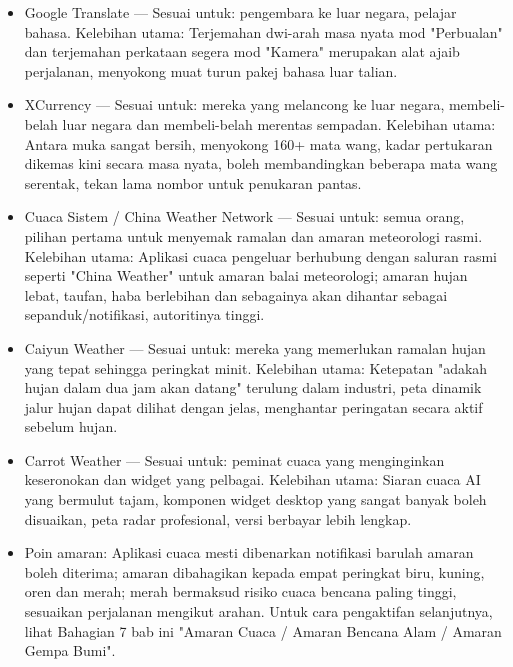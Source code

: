 
\begin{itemize}
  \item Google Translate — Sesuai untuk: pengembara ke luar negara, pelajar bahasa. Kelebihan utama: Terjemahan dwi-arah masa nyata mod "Perbualan" dan terjemahan perkataan segera mod "Kamera" merupakan alat ajaib perjalanan, menyokong muat turun pakej bahasa luar talian.
\end{itemize}


\begin{itemize}
  \item XCurrency — Sesuai untuk: mereka yang melancong ke luar negara, membeli-belah luar negara dan membeli-belah merentas sempadan. Kelebihan utama: Antara muka sangat bersih, menyokong 160+ mata wang, kadar pertukaran dikemas kini secara masa nyata, boleh membandingkan beberapa mata wang serentak, tekan lama nombor untuk penukaran pantas.
\end{itemize}


\begin{itemize}
  \item Cuaca Sistem / China Weather Network — Sesuai untuk: semua orang, pilihan pertama untuk menyemak ramalan dan amaran meteorologi rasmi. Kelebihan utama: Aplikasi cuaca pengeluar berhubung dengan saluran rasmi seperti "China Weather" untuk amaran balai meteorologi; amaran hujan lebat, taufan, haba berlebihan dan sebagainya akan dihantar sebagai sepanduk/notifikasi, autoritinya tinggi.
  \item Caiyun Weather — Sesuai untuk: mereka yang memerlukan ramalan hujan yang tepat sehingga peringkat minit. Kelebihan utama: Ketepatan "adakah hujan dalam dua jam akan datang" terulung dalam industri, peta dinamik jalur hujan dapat dilihat dengan jelas, menghantar peringatan secara aktif sebelum hujan.
  \item Carrot Weather — Sesuai untuk: peminat cuaca yang menginginkan keseronokan dan widget yang pelbagai. Kelebihan utama: Siaran cuaca AI yang bermulut tajam, komponen widget desktop yang sangat banyak boleh disuaikan, peta radar profesional, versi berbayar lebih lengkap.
  \item Poin amaran: Aplikasi cuaca mesti dibenarkan notifikasi barulah amaran boleh diterima; amaran dibahagikan kepada empat peringkat biru, kuning, oren dan merah; merah bermaksud risiko cuaca bencana paling tinggi, sesuaikan perjalanan mengikut arahan. Untuk cara pengaktifan selanjutnya, lihat Bahagian 7 bab ini "Amaran Cuaca / Amaran Bencana Alam / Amaran Gempa Bumi".
\end{itemize}

